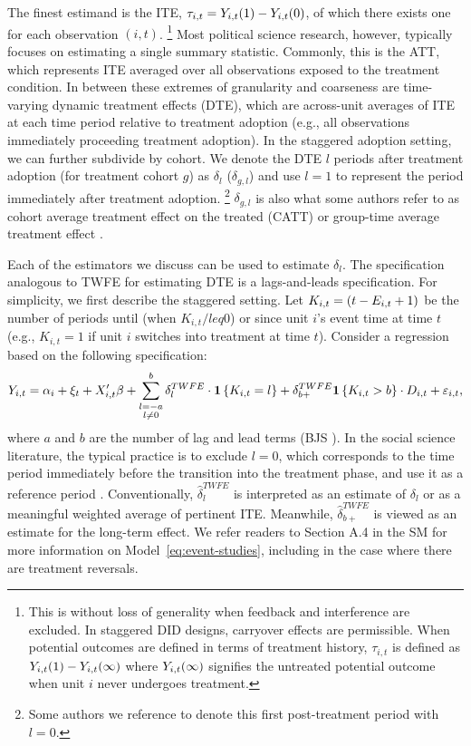 \documentclass[12pt]{article}
\begin{document}
The finest estimand is the ITE, $\tau_{i,t}=Y_{i,t}(1)-Y_{i,t}(0)$, of which there exists one for each observation $(i,t)$.%
%
\footnote{This is without loss of generality when feedback and interference are excluded. In staggered DID designs, carryover effects are permissible. When potential outcomes are defined in terms of treatment history, $\tau_{i,t}$ is defined as $Y_{i,t}(1)-Y_{i,t}(\infty)$ where $Y_{i,t}(\infty)$ signifies the untreated potential outcome when unit $i$ never undergoes treatment.} %
%
Most
political science research, however, typically focuses on estimating a single summary statistic. Commonly, this is the ATT, which represents ITE
averaged over all observations exposed to the treatment condition. 
In between these extremes of granularity and coarseness are time-varying dynamic treatment
effects (DTE), which are across-unit averages of ITE at each
time period relative to treatment adoption (e.g., all observations immediately proceeding treatment adoption). In the staggered adoption setting, we can further subdivide by cohort. We denote
the DTE $l$ periods after treatment adoption (for treatment cohort $g$) as
$\delta_{l}$ ($\delta_{g,l}$) and use $l=1$ to represent the period immediately after treatment adoption.%
\footnote{Some authors we reference to denote this first post-treatment period with $l=0$.} 
$\delta_{g,l}$ is also what some authors refer to as cohort average treatment effect on the treated (CATT) \citep{Strezhnev2018-ku, sun2021-event} or group-time average treatment effect \citep{callaway2021-did}.%



Each of the estimators we discuss can be used to estimate $\delta_l$. The specification analogous to TWFE for estimating DTE is a lags-and-leads specification. %
For simplicity, we first describe the staggered setting. Let $K_{i,t}=(t-E_{i,t}+1)$ be the number of periods until (when $K_{i,t}/leq 0$) or since unit $i$'s event time at time $t$ (e.g., $K_{i,t} = 1$ if unit $i$ switches into treatment at time $t$). Consider a regression based on the following specification:
\vspace{-1em}\begin{align}\label{eq:event-studies} 
\Yit = \alpha_i + \xi_t + X^{\prime}_{i,t}\beta + \sum_{\substack{l=-a\\l\neq 0}}^{b} \delta_{l}^{TWFE}
\cdot \indic{K_{i,t}=l} + \delta_{b+}^{TWFE}\indic{K_{i,t}> b}\cdot D_{i,t} + \epit, \vspace{-1em}
\end{align} 
where $a$ and $b$ are the number of lag and lead terms (BJS \citeyear{BJS2021}). In the social science literature, the typical practice is to exclude $l= 0$, which corresponds to the time period immediately before the transition into the treatment phase, and use it as a reference period \citep{roth2019pre}. Conventionally, $\hat\delta^{TWFE}_{l}$ is interpreted as an estimate of $\delta_l$ or as a meaningful weighted average of pertinent ITE. Meanwhile, $\hat\delta^{TWFE}_{b+}$ is viewed as an estimate for the long-term effect. We refer readers to Section A.4 in the SM for more information on Model~\eqref{eq:event-studies}, including in the case where there are treatment reversals.
\end{document}
